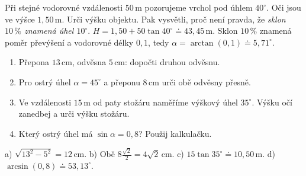 \documentclass[11pt,a4paper]{article}
\begin{document}
\begin{zadaniReseniBox}[title={Rozšíření 1},breakable=false]
Při stejné vodorovné vzdálenosti $50\,\mathrm m$ pozorujeme vrchol pod úhlem
$40^\circ$. Oči jsou ve výšce $1{,}50\,\mathrm m$. Urči výšku objektu.
Pak vysvětli, proč není pravda, že \emph{sklon $10\,\%$ znamená úhel $10^\circ$}.
\tcblower
$H=1{,}50+50\tan40^\circ\doteq43{,}45\,\mathrm m$.
Sklon $10\,\%$ znamená poměr převýšení a vodorovné délky $0{,}1$,
tedy $\alpha=\arctan(0{,}1)\doteq5{,}71^\circ$.
\end{zadaniReseniBox}
\begin{zadaniReseniBox}[title={Domácí úkol}]
\begin{enumerate}[label=\alph*)]
\item Přepona $13\,\mathrm{cm}$, odvěsna $5\,\mathrm{cm}$: dopočti druhou odvěsnu.
\item Pro ostrý úhel $\alpha=45^\circ$ a přeponu $8\,\mathrm{cm}$ urči obě odvěsny přesně.
\item Ve vzdálenosti $15\,\mathrm m$ od paty stožáru naměříme výškový úhel $35^\circ$.
Výšku očí zanedbej a urči výšku stožáru.
\item Který ostrý úhel má $\sin\alpha=0{,}8$? Použij kalkulačku.
\end{enumerate}
\tcblower
a) $\sqrt{13^2-5^2}=12\,\mathrm{cm}$.
b) Obě $8\frac{\sqrt2}{2}=4\sqrt2\,\mathrm{cm}$.
c) $15\tan35^\circ\doteq10{,}50\,\mathrm m$.
d) $\arcsin(0{,}8)\doteq53{,}13^\circ$.
\end{zadaniReseniBox}
\end{document}

